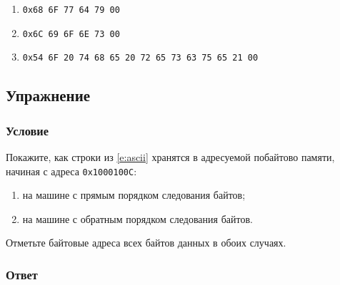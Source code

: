 \documentclass[12pt]{article}
\newenvironment{e}[1][dummy label]{
    \subsection{Упражнение}\label{#1}
    \subsubsection*{Условие}
    }{
    \subsubsection*{Ответ}
}
\newcommand{\eref}[1]{\hyperref[{e:#1}]{\nameref*{e:#1} \ref*{e:#1}}}
\begin{document}
    \begin{enumerate}
        \item \texttt{0x68 6F 77 64 79 00}
        \item \texttt{0x6C 69 6F 6E 73 00}
        \item \texttt{0x54 6F 20 74 68 65 20 72 65 73 63 75 65 21 00}
    \end{enumerate}

    \begin{e}[e:asciib]
        Покажите, как строки из \eref{ascii} хранятся в адресуемой побайтово памяти, начиная с адреса \texttt{0x1000100C}:
        \begin{enumerate}
            \item на машине с прямым порядком следования байтов;
            \item на машине с обратным порядком следования байтов.
        \end{enumerate}
        Отметьте байтовые адреса всех байтов данных в обоих случаях.
    \end{e}
\end{document}
